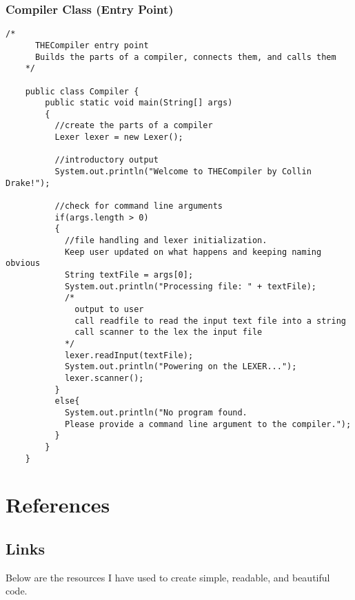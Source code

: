\documentclass[letterpaper, 10pt,DIV=13]{scrartcl}
\numberwithin{equation}{section} %
\numberwithin{figure}{section} %
\numberwithin{table}{section} %
\begin{document}
\subsubsection*{Compiler Class (Entry Point)}
    \lstset{numbers=left, numberstyle=\tiny, stepnumber=1, numbersep=5pt, basicstyle=\footnotesize\ttfamily}
    \begin{lstlisting}[frame=single, ]
    /*
      THECompiler entry point
      Builds the parts of a compiler, connects them, and calls them
    */
    
    public class Compiler {
        public static void main(String[] args) 
        {
          //create the parts of a compiler
          Lexer lexer = new Lexer();
    
          //introductory output
          System.out.println("Welcome to THECompiler by Collin Drake!");
    
          //check for command line arguments
          if(args.length > 0)
          {
            //file handling and lexer initialization.
            Keep user updated on what happens and keeping naming obvious
            String textFile = args[0];
            System.out.println("Processing file: " + textFile);
            /*
              output to user
              call readfile to read the input text file into a string
              call scanner to the lex the input file
            */
            lexer.readInput(textFile);
            System.out.println("Powering on the LEXER...");
            lexer.scanner();
          }
          else{
            System.out.println("No program found. 
            Please provide a command line argument to the compiler.");
          }
        }
    }
    \end{lstlisting}

\pagebreak

\section{References}

\subsection{Links}
Below are the resources I have used to create simple, readable, and beautiful code.
\end{document}
